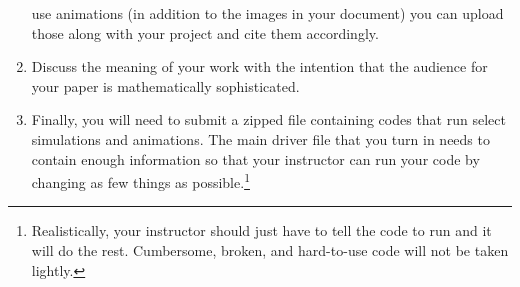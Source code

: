 \begin{enumerate}
        use animations (in addition to the images in your document) you can upload those
        along with your project and cite them accordingly.
    \item Discuss the meaning of your work with the intention that the audience for your
        paper is mathematically sophisticated.
    \item Finally, you will need to submit a zipped file containing \ProgLang codes that run
        select simulations and animations.  The main driver file that you turn in needs to
        contain enough information so that your instructor can run your code by changing
        as few things as possible.\footnote{Realistically, your instructor should just
            have to tell the code to run and it will do the rest.  Cumbersome, broken, and
        hard-to-use code will not be taken lightly.}
\end{enumerate}



